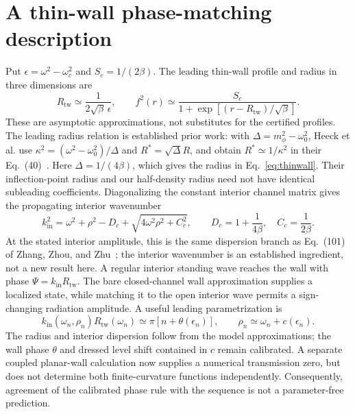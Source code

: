 \documentclass[a4paper,11pt]{article}
\begin{document}
\section{A thin-wall phase-matching description}\label{sec:thinwall}
Put $\epsilon=\omega^2-\omega_c^2$ and $S_c=1/(2\beta)$.
The leading thin-wall profile and radius in three dimensions are
\begin{equation}\label{eq:thinwall}
R_{\mathrm{tw}}\simeq\frac{1}{2\sqrt\beta\,\epsilon},\qquad
f^2(r)\simeq\frac{S_c}{1+\exp[(r-R_{\mathrm{tw}})/\sqrt\beta]}.
\end{equation}
These are asymptotic approximations, not substitutes for the certified
profiles. The leading radius relation is established prior work: with
$\Delta=m_\phi^2-\omega_0^2$, Heeck et al. use
$\kappa^2=(\omega^2-\omega_0^2)/\Delta$ and
$R^*=\sqrt\Delta R$, and obtain $R^*\simeq1/\kappa^2$
in their Eq.~(40)~\cite{Heeck2021}.
Here $\Delta=1/(4\beta)$, which gives the radius in
Eq.~\eqref{eq:thinwall}. Their inflection-point radius and our
half-density radius need not have identical subleading coefficients.
Diagonalizing the constant interior channel matrix gives the
propagating interior wavenumber
\begin{equation}\label{eq:interior}
k_{\mathrm{in}}^2=\omega^2+\rho^2-D_c+
 \sqrt{4\omega^2\rho^2+C_c^2},\qquad
D_c=1+\frac1{4\beta},\quad C_c=\frac1{2\beta}.
\end{equation}
At the stated interior amplitude, this is the same dispersion branch as
Eq.~(101) of Zhang, Zhou, and Zhu~\cite{ZhangZhouZhu2025}; the interior
wavenumber is an established ingredient, not a new result here.
A regular interior standing wave reaches the wall with phase
$\Psi=k_{\mathrm{in}}R_{\mathrm{tw}}$. The bare closed-channel wall approximation
supplies a localized state, while matching it to the open interior
wave permits a sign-changing radiation amplitude. A useful leading
parametrization is
\begin{equation}\label{eq:phase}
k_{\mathrm{in}}(\omega_n,\rho_n)R_{\mathrm{tw}}(\omega_n)
 \simeq\pi[n+\theta(\epsilon_n)],\qquad
\rho_n\simeq\omega_n+c(\epsilon_n).
\end{equation}
The radius and interior dispersion follow from the model approximations;
the wall phase $\theta$ and dressed level shift contained in $c$ remain
calibrated. A separate coupled planar-wall calculation now supplies a
numerical transmission zero, but does not determine both finite-curvature
functions independently. Consequently, agreement of the calibrated
phase rule with the sequence is not a parameter-free prediction.
\end{document}
